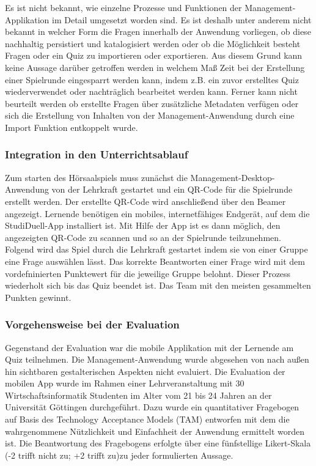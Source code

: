 \documentclass[conference]{IEEEtran}
\begin{document}
Es ist nicht bekannt, wie einzelne Prozesse und Funktionen der Management-Applikation im Detail umgesetzt worden sind. Es ist deshalb unter anderem nicht bekannt in welcher Form die Fragen innerhalb der Anwendung vorliegen, ob diese nachhaltig persistiert und katalogisiert werden oder ob die Möglichkeit besteht Fragen oder ein Quiz zu importieren oder exportieren. Aus diesem Grund kann keine Aussage darüber getroffen werden in welchem Maß Zeit bei der Erstellung einer Spielrunde eingesparrt werden kann, indem z.B. ein zuvor erstelltes Quiz wiederverwendet oder nachträglich bearbeitet werden kann. Ferner kann nicht beurteilt werden ob erstellte Fragen über zusätzliche Metadaten verfügen oder sich die Erstellung von Inhalten von der Management-Anwendung durch eine Import Funktion entkoppelt wurde. 
\\
\subsubsection{Integration in den Unterrichtsablauf}
Zum starten des Hörsaalspiels muss zunächst die Management-Desktop-Anwendung von der Lehrkraft gestartet und ein QR-Code für die Spielrunde erstellt werden. Der erstellte QR-Code wird anschließend über den Beamer angezeigt. Lernende benötigen ein mobiles, internetfähiges Endgerät, auf dem die StudiDuell-App installiert ist. Mit Hilfe der App ist es dann möglich, den angezeigten QR-Code zu scannen und so an der Spielrunde teilzunehmen. Folgend wird das Spiel durch die Lehrkraft gestartet indem sie von einer Gruppe eine Frage auswählen lässt. Das korrekte Beantworten einer Frage wird mit dem vordefninierten Punktewert für die jeweilige Gruppe belohnt. Dieser Prozess wiederholt sich bis das Quiz beendet ist. Das Team mit den meisten gesammelten Punkten gewinnt. \cite[p. 340f]{Hobert2017}
\\
\subsubsection{Vorgehensweise bei der Evaluation}
Gegenstand der Evaluation war die mobile Applikation mit der Lernende am Quiz teilnehmen. Die Management-Anwendung wurde abgesehen von nach außen hin sichtbaren gestalterischen Aspekten nicht evaluiert. Die Evaluation der mobilen App wurde im Rahmen einer Lehrveranstaltung mit 30 Wirtschaftsinformatik Studenten im Alter vom 21 bis 24 Jahren an der Universität Göttingen durchgeführt. Dazu wurde ein quantitativer Fragebogen auf Basis des Technology Acceptance Models (TAM) \cite[p. 985]{Davis1989} entworfen mit dem die wahrgenommene Nützlichkeit und Einfachheit der Anwendung ermittelt worden ist. Die Beantwortung des Fragebogens erfolgte über eine fünfstellige Likert-Skala (-2 trifft nicht zu; +2 trifft zu)zu jeder formulierten Aussage.\cite[p. 342]{Hobert2017}
\end{document}
